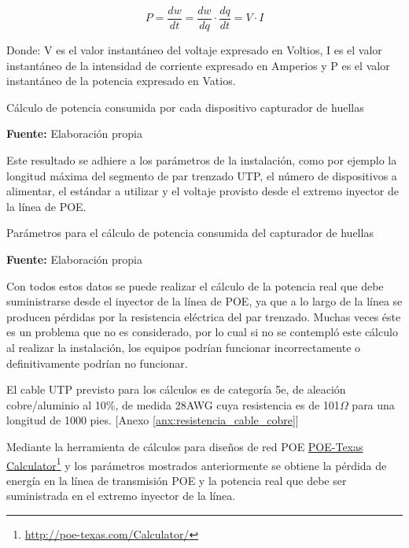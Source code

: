 \documentclass[../principal]{subfiles}
\begin{document}
  \vspace{-1.5em}
  \begin{equation}
    \label{calculo_potencia}
    P = \frac{dw}{dt} = \frac{dw}{dq} \cdot \frac{dq}{dt} = V \cdot I
  \end{equation}
  \vspace{-2em}

  Donde: V es el valor instantáneo del voltaje expresado en Voltios, I es el valor instantáneo de la intensidad de corriente expresado en Amperios y P es el valor instantáneo de la potencia expresado en Vatios.

  \begin{table}[H]
    \centering
    \caption{Cálculo de potencia consumida por cada dispositivo capturador de huellas}
    
    \caption*{\textbf{Fuente:} Elaboración propia}
  \end{table}

  Este resultado se adhiere a los parámetros de la instalación, como por ejemplo la longitud máxima del segmento de par trenzado UTP, el número de dispositivos a alimentar, el estándar a utilizar y el voltaje provisto desde el extremo inyector de la línea de POE.

  \begin{table}[H]
    \centering
    \caption{Parámetros para el cálculo de potencia consumida del capturador de huellas}
    
    \caption*{\textbf{Fuente:} Elaboración propia}
  \end{table}

  Con todos estos datos se puede realizar el cálculo de la potencia real que debe suministrarse desde el inyector de la línea de POE, ya que a lo largo de la línea se producen pérdidas por la resistencia eléctrica del par trenzado. Muchas veces éste es un problema que no es considerado, por lo cual si no se contempló este cálculo al realizar la instalación, los equipos podrían funcionar incorrectamente o definitivamente podrían no funcionar.

  El cable UTP previsto para los cálculos es de categoría 5e, de aleación cobre/aluminio al 10\%, de medida 28AWG cuya resistencia es de 101$ \Omega $ para una longitud de 1000 pies. [Anexo \ref{anx:resistencia_cable_cobre}]

  Mediante la herramienta de cálculos para diseños de red POE \href{http://poe-texas.com/Calculator/}{POE-Texas Calculator}\footnote{\href{http://poe-texas.com/Calculator/}{http://poe-texas.com/Calculator/}} y los parámetros mostrados anteriormente se obtiene la pérdida de energía en la línea de transmisión POE y la potencia real que debe ser suministrada en el extremo inyector de la línea.
\end{document}

